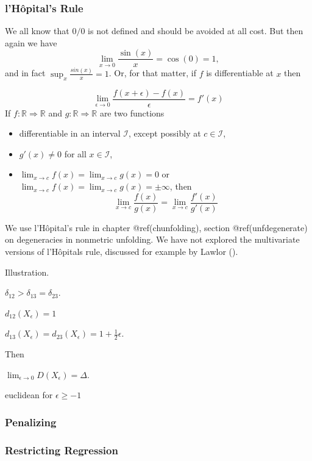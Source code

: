 \documentclass[
  12pt,
  letterpaper,
  DIV=11,
  numbers=noendperiod]{scrreprt}
\providecommand{\tightlist}{%
  \setlength{\itemsep}{0pt}\setlength{\parskip}{0pt}}\usepackage{longtable,booktabs,array}
\theoremstyle{remark}
\begin{document}
\subsubsection{l'Hôpital's Rule}\label{hopital}

We all know that \(0/0\) is not defined and should be avoided at all
cost. But then again we have \[
\lim_{x\rightarrow 0}\frac{\sin(x)}{x}=\cos(0)=1,
\] and in fact \(\sup_x \frac{sin(x)}{x}=1\). Or, for that matter, if
\(f\) is differentiable at \(x\) then

\[
\lim_{\epsilon\rightarrow 0}\frac{f(x+\epsilon)-f(x)}{\epsilon}=f'(x)
\] If \(f:\mathbb{R}\Rightarrow\mathbb{R}\) and
\(g:\mathbb{R}\Rightarrow\mathbb{R}\) are two functions

\begin{itemize}
\tightlist
\item
  differentiable in an interval \(\mathcal{I}\), except possibly at
  \(c\in\mathcal{I}\),
\item
  \(g'(x)\not=0\) for all \(x\in\mathcal{I}\),
\item
  \(\lim_{x\rightarrow c}f(x)=\lim_{x\rightarrow c}g(x)=0\) or
  \(\lim_{x\rightarrow c}f(x)=\lim_{x\rightarrow c}g(x)=\pm\infty\),
  then \[
  \lim_{x\rightarrow c}\frac{f(x)}{g(x)}=\lim_{x\rightarrow c}\frac{f'(x)}{g'(x)}
  \]
\end{itemize}

We use l'Hôpital's rule in chapter @ref(chunfolding), section
@ref(unfdegenerate) on degeneracies in nonmetric unfolding. We have not
explored the multivariate versions of l'Hôpitals rule, discussed for
example by Lawlor ().

Illustration.

\(\delta_{12}>\delta_{13}=\delta_{23}\).

\(d_{12}(X_\epsilon)=1\)

\(d_{13}(X_\epsilon)=d_{23}(X_\epsilon)=1+\frac12\epsilon\).

Then

\(\lim_{\epsilon\rightarrow 0}D(X_\epsilon)=\Delta\).

euclidean for \(\epsilon\geq-1\)

\subsubsection{Penalizing}\label{penalizing}

\subsubsection{Restricting Regression}\label{restricting-regression}
\end{document}
